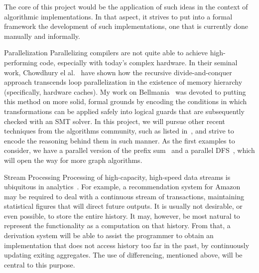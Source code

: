 The core of this project would be the application of such ideas in the context of
algorithmic implementations.
In that aspect, it strives to put into a formal framework the development of such
implementations, one that is currently done manually and informally.

\begin{paragraph}{Parallelization}
Parallelizing compilers are not quite able to achieve high-performing code, especially
with today's complex hardware.
In their seminal work, Chowdhury el al.~\cite{SODA2006/Chowdhury} have shown how the
recursive divide-and-conquer approach transcends loop parallelization in the existence
of memory hierarchy (specifically, hardware caches).
My work on Bellmania~\cite{OOPSLA2016/Itzhaky} was devoted to putting this method on
more solid, formal grounds by encoding the conditions in which transformations can
be applied safely into logical guards that are subsequently checked with an SMT solver.
In this project, we will pursue other recent techniques from the algorithms community,
such as listed in~\cite{Thesis/Shun,SPAA2018/Dhulipala}, and strive to encode the
reasoning behind them in such manner.
As the first examples to consider, we have a parallel version of the prefix sum~\cite{1993/Blelloch}
and a parallel DFS~\cite{SC2015/Acar}, which will open the way for more graph
algorithms.
\end{paragraph}

\begin{paragraph}{Stream Processing}
Processing of high-capacity, high-speed data streams is ubiquitous in analytics~\cite{ECOOP2014/Vaziri}.
For example, a recommendation system for Amazon may be required to deal with a continuous
stream of transactions, maintaining statistical figures that will direct future outputs.
It is usually not desirable, or even possible, to store the entire history.
It may, however, be most natural to represent the functionality as a computation on that history.
From that, a derivation system will be able to assist the programmer to obtain an implementation
that does not access history too far in the past, by continuously updating exiting aggregates.
The use of differencing, mentioned above, will be central to this purpose.
\end{paragraph}


